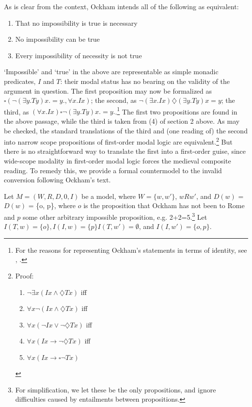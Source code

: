 \documentclass[]{article}
\begin{document}
As is clear from the context, Ockham intends all of the following as equivalent: 
\begin{enumerate}
	\item That no impossibility is true is necessary
	
	\item No impossibility can be true
	
	\item Every impossibility of necessity is not true
\end{enumerate}


`Impossible' and `true' in the above are representable as simple monadic predicates, $I$ and $T$: their modal status has no bearing on the validity of the argument in question. The first proposition may now be formalized as $\square(\neg (\exists y.Ty)x. = y., \forall x.Ix)$; the second, as $\neg (\exists x.Ix)\diamondsuit (\exists y.Ty)x=y$; the third, as $(\forall x.Ix)\square \neg (\exists y.Ty)x.=y.$.\footnote{For the reasons for representing Ockham's statements in terms of identity, see \cite{Klima1999}, \cite{Klima2008a}.} The first two propositions are found in the above passage, while the third is taken from (4) of section 2 above. As may be checked, the standard translations of the third and (one reading of) the second into narrow scope propositions of first-order modal logic are equivalent.\footnote{Proof: \begin{enumerate}
		\item $\neg\exists x(Ix \wedge \diamondsuit Tx)$ iff
		\item $\forall x \neg(Ix \wedge \diamondsuit Tx)$ iff
		\item $\forall x (\neg Ix \vee \neg\diamondsuit Tx)$ iff
		\item $\forall x (Ix \rightarrow \neg \diamondsuit Tx)$ iff
		\item $\forall x (Ix \rightarrow \square \neg Tx)$
	\end{enumerate}} 
	But there is no straightforward way to translate the first into a first-order guise, since wide-scope modality in first-order modal logic forces the medieval composite reading. To remedy this, we provide a formal countermodel to the invalid conversion following Ockham's text.
	
	Let $M = (W, R, D, 0, I)$ be a model, where $W = \{w, w'\}$, $wRw'$, and $D(w)$ = $D(w)$ = \{o, p\}, where $o$ is the proposition that Ockham has not been to Rome and $p$ some other arbitrary impossible proposition, e.g. 2+2=5.\footnote{For simplification, we let these be the only propositions, and ignore difficulties caused by entailments between propositions.} Let $I(T, w) = \{o\}, I(I, w) = \{p\} I(T, w') = \emptyset$, and $I(I, w') = \{o, p\}$. 
	
\end{document}
